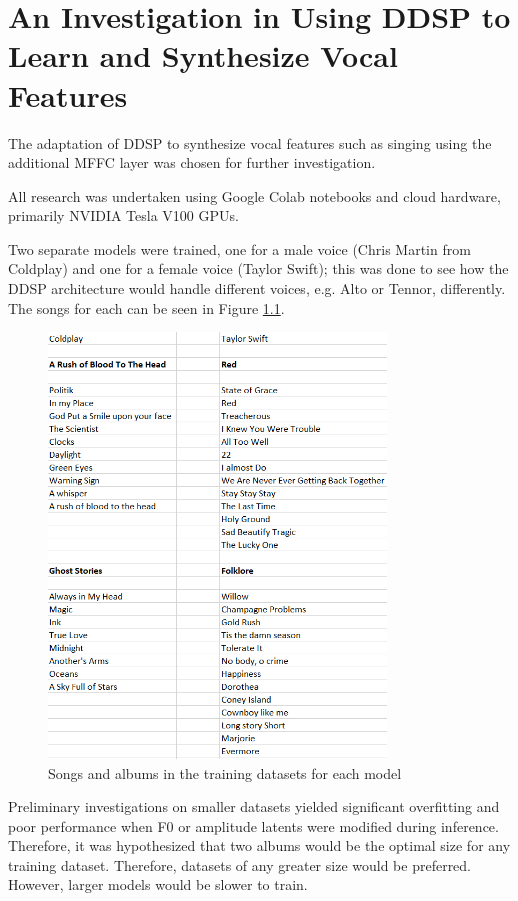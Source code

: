 \chapter{An Investigation in Using DDSP to Learn and Synthesize Vocal Features}

The adaptation of DDSP to synthesize vocal features such as singing using the additional MFFC layer was chosen for further investigation.

All research was undertaken using Google Colab notebooks and cloud hardware, primarily NVIDIA Tesla V100 GPUs.

Two separate models were trained, one for a male voice (Chris Martin from Coldplay) and one for a female voice (Taylor Swift); this was done to see how the DDSP architecture would handle different voices, e.g. Alto or Tennor, differently. The songs for each can be seen in Figure \ref{fig:DatasetSongs}.

\begin{figure}[H]
    \centering
    \includegraphics[width=0.8\textwidth]{research/dataset_preparation/DatasetSongs.png}
    \caption{Songs and albums in the training datasets for each model}
    \label{fig:DatasetSongs}
\end{figure}

Preliminary investigations on smaller datasets yielded significant overfitting and poor performance when F0 or amplitude latents were modified during inference. Therefore, it was hypothesized that two albums would be the optimal size for any training dataset. Therefore, datasets of any greater size would be preferred. However, larger models would be slower to train.





